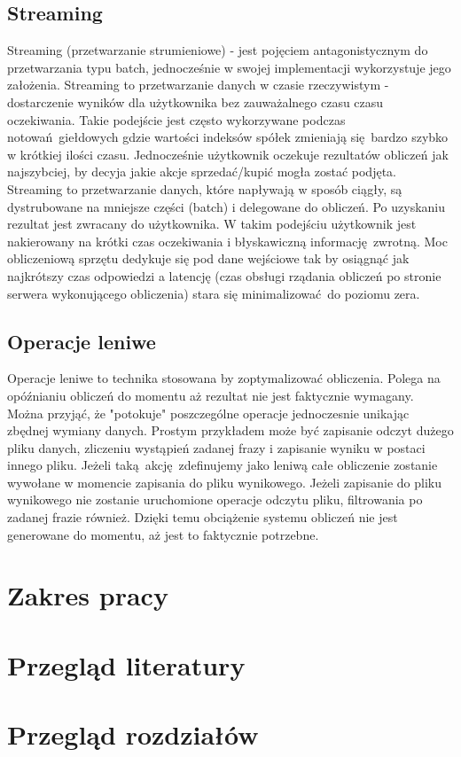 \subsection{Streaming}
Streaming (przetwarzanie strumieniowe) - jest pojęciem antagonistycznym do przetwarzania typu batch, jednocześnie w swojej implementacji wykorzystuje jego założenia. Streaming to przetwarzanie danych w czasie rzeczywistym - dostarczenie wyników dla użytkownika bez zauważalnego czasu czasu oczekiwania. Takie podejście jest często wykorzywane podczas notowań giełdowych gdzie wartości indeksów spółek zmieniają się bardzo szybko w krótkiej ilości czasu. Jednocześnie użytkownik oczekuje rezultatów obliczeń jak najszybciej, by decyja jakie akcje sprzedać/kupić mogła zostać podjęta. Streaming to przetwarzanie danych, które napływają w sposób ciągły, są dystrubowane na mniejsze części (batch) i delegowane do obliczeń. Po uzyskaniu rezultat jest zwracany do użytkownika. W takim podejściu użytkownik jest nakierowany na krótki czas oczekiwania i błyskawiczną informację zwrotną. Moc obliczeniową sprzętu dedykuje się pod dane wejściowe tak by osiągnąć jak najkrótszy czas odpowiedzi a latencję (czas obsługi rządania obliczeń po stronie serwera wykonującego obliczenia) stara się minimalizować do poziomu zera.
\subsection{Operacje leniwe}
Operacje leniwe to technika stosowana by zoptymalizować obliczenia. Polega na opóźnianiu obliczeń do momentu aż rezultat nie jest faktycznie wymagany. Można przyjąć, że "potokuje" poszczególne operacje jednoczesnie unikając zbędnej wymiany danych. Prostym przykładem może być zapisanie odczyt dużego pliku danych, zliczeniu wystąpień zadanej frazy i zapisanie wyniku w postaci innego pliku. Jeżeli taką akcję zdefinujemy jako leniwą całe obliczenie zostanie wywołane w momencie zapisania do pliku wynikowego. Jeżeli zapisanie do pliku wynikowego nie zostanie uruchomione operacje odczytu pliku, filtrowania po zadanej frazie również. Dzięki temu obciążenie systemu obliczeń nie jest generowane do momentu, aż jest to faktycznie potrzebne. 

\section{Zakres pracy}
\section{Przegląd literatury}
\section{Przegląd rozdziałów}
